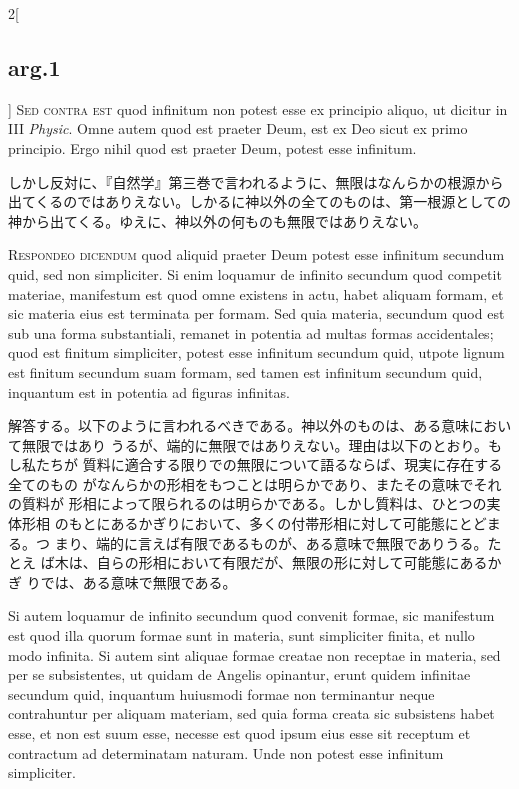 \documentclass[paper=a4paper,fontsize=10pt,jafontsize=9pt,titlepage]{jlreq}
\begin{document}
\begin{paracol}{2}[\subsection{arg.1}]
{\scshape Sed contra est} quod infinitum non potest esse ex principio aliquo, ut
dicitur in III {\itshape Physic}. Omne autem quod est praeter Deum, est ex Deo
sicut ex primo principio. Ergo nihil quod est praeter Deum, potest esse
infinitum.

\switchcolumn

しかし反対に、『自然学』第三巻で言われるように、無限はなんらかの根源から出てくるのではありえない。しかるに神以外の全てのものは、第一根源としての神から出てくる。ゆえに、神以外の何ものも無限ではありえない。


{\scshape Respondeo dicendum} quod aliquid praeter Deum potest esse infinitum
secundum quid, sed non simpliciter. Si enim loquamur de infinito
secundum quod competit materiae, manifestum est quod omne existens in
actu, habet aliquam formam, et sic materia eius est terminata per
formam. Sed quia materia, secundum quod est sub una forma substantiali,
remanet in potentia ad multas formas accidentales; quod est finitum
simpliciter, potest esse infinitum secundum quid, utpote lignum est
finitum secundum suam formam, sed tamen est infinitum secundum quid,
inquantum est in potentia ad figuras infinitas.

\switchcolumn

解答する。以下のように言われるべきである。神以外のものは、ある意味において無限ではあり
 うるが、端的に無限ではありえない。理由は以下のとおり。もし私たちが
 質料に適合する限りでの無限について語るならば、現実に存在する全てのもの
 がなんらかの形相をもつことは明らかであり、またその意味でそれの質料が
 形相によって限られるのは明らかである。しかし質料は、ひとつの実体形相
 のもとにあるかぎりにおいて、多くの付帯形相に対して可能態にとどまる。つ
 まり、端的に言えば有限であるものが、ある意味で無限でありうる。たとえ
 ば木は、自らの形相において有限だが、無限の形に対して可能態にあるかぎ
 りでは、ある意味で無限である。

\switchcolumn*

Si autem loquamur de infinito secundum quod convenit formae, sic
manifestum est quod illa quorum formae sunt in materia, sunt simpliciter
finita, et nullo modo infinita. Si autem sint aliquae formae creatae non
receptae in materia, sed per se subsistentes, ut quidam de Angelis
opinantur, erunt quidem infinitae secundum quid, inquantum huiusmodi
formae non terminantur neque contrahuntur per aliquam materiam, sed quia
forma creata sic subsistens habet esse, et non est suum esse, necesse
est quod ipsum eius esse sit receptum et contractum ad determinatam
naturam. Unde non potest esse infinitum simpliciter.


\end{paracol}
\end{document}
